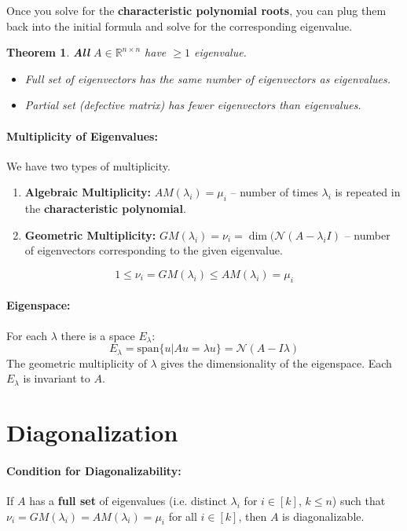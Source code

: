 \documentclass[a4paper,12pt]{report}
\def\reals{\mathbb{R}}
\newtheorem{theorem}{Theorem}
\begin{document}
Once you solve for the \textbf{characteristic polynomial roots}, you can plug them back into the initial formula and solve for the corresponding eigenvalue.

\begin{theorem}
\textbf{All} $A\in\reals^{n\times n}$ have $\geq 1$ eigenvalue.
\begin{itemize}
\item Full set of eigenvectors has the same number of eigenvectors as eigenvalues.
\item Partial set (defective matrix) has fewer eigenvectors than eigenvalues.
\end{itemize}
\end{theorem}

\paragraph{Multiplicity of Eigenvalues: } We have two types of multiplicity.
\begin{enumerate}
\item \textbf{Algebraic Multiplicity: } $AM(\lambda_i) = \mu_i$ -- number of times $\lambda_i$ is repeated in the \textbf{characteristic polynomial}.
\item \textbf{Geometric Multiplicity: } $GM(\lambda_i) = \nu_i = \dim(\mathcal{N}(A-\lambda_i I)$ -- number of eigenvectors corresponding to the given eigenvalue.
\end{enumerate}

$$1 \leq \nu_i = GM(\lambda_i) \leq AM(\lambda_i) = \mu_i$$

\paragraph{Eigenspace: } For each $\lambda$ there is a space $E_\lambda$: 
\begin{equation}
	E_{\lambda} = \text{span}\{u|Au = \lambda u\} = \mathcal{N}(A-I\lambda)
\end{equation}
The geometric multiplicity of $\lambda$ gives the dimensionality of the eigenspace. Each $E_\lambda$ is invariant to $A$.

\section{Diagonalization}

\paragraph{Condition for Diagonalizability: } If $A$ has a \textbf{full set} of eigenvalues (i.e. distinct $\lambda_i$ for $i\in[k]$, $k \leq n$) such that $\nu_i = GM(\lambda_i) = AM(\lambda_i) = \mu_i$ for all $i \in [k]$, then $A$ is diagonalizable.
\end{document}
